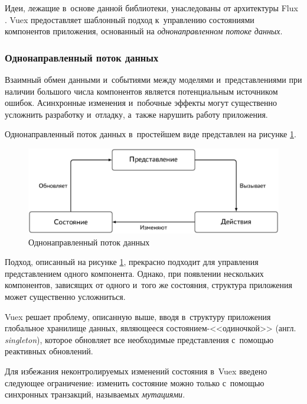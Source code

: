 Идеи, лежащие в~основе данной библиотеки, унаследованы от архитектуры Flux \cite{Flux}. Vuex предоставляет шаблонный подход к~управлению состояниями компонентов приложения, основанный на \emph{однонаправленном потоке данных}.


\subsubsection{Однонаправленный поток данных}

Взаимный обмен данными и~событиями между моделями и~представлениями при наличии большого числа компонентов является потенциальным источником ошибок. Асинхронные изменения и~побочные эффекты могут существенно усложнить разработку и~отладку, а~также нарушить работу приложения.

Однонаправленный поток данных в~простейшем виде представлен на рисунке \ref{fig:simple-oneway-data-flow}.

\begin{figure}[h!]
  \centering
  \setlength{\fboxsep}{5pt}
  \includegraphics[width=.9\textwidth]{img/tikz/simple-oneway-data-flow/pic}
  \vspace*{12pt}
  \caption{Однонаправленный поток данных}\label{fig:simple-oneway-data-flow}
\end{figure}

\newpage

Подход, описанный на рисунке \ref{fig:simple-oneway-data-flow}, прекрасно подходит для управления представлением одного компонента. Однако, при появлении нескольких компонентов, зависящих от одного и~того же состояния, структура приложения может существенно усложниться.

Vuex решает проблему, описанную выше, вводя в~структуру приложения глобальное хранилище данных, являющееся состоянием-<<одиночкой>> (англ. \emph{singleton}), которое обновляет все необходимые представления с~помощью реактивных обновлений.

Для избежания неконтролируемых изменений состояния в~Vuex введено следующее ограничение: изменить состояние можно только с~помощью синхронных транзакций, называемых \emph{мутациями}.

